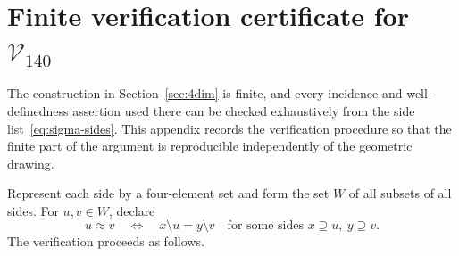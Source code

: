\documentclass{article}   	%
\theoremstyle{plain}
\theoremstyle{definition}
\theoremstyle{remark}
\begin{document}
\section{Finite verification certificate for $\mathcal V_{140}$}
\label{app:v140-certificate}

The construction in Section~\ref{sec:4dim} is finite, and every incidence and
well-definedness assertion used there can be checked exhaustively from the
side list~\eqref{eq:sigma-sides}.  This appendix records the verification
procedure so that the finite part of the argument is reproducible independently
of the geometric drawing.

Represent each side by a four-element set and form the set $W$ of all subsets
of all sides.  For $u,v\in W$, declare
\[
u\approx v
\quad\Longleftrightarrow\quad
x\setminus u=y\setminus v
\quad\text{for some sides }x\supseteq u,
\ y\supseteq v.
\]
The verification proceeds as follows.
\end{document}
